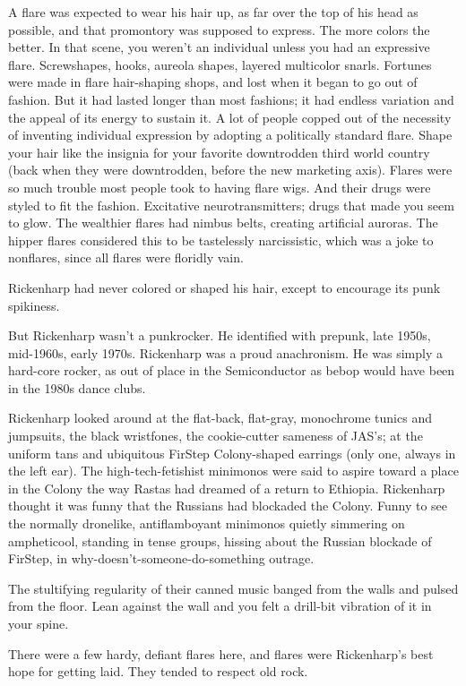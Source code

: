 A flare was expected to wear his hair up, as far over the top of his head as possible, and that promontory was supposed to express. The more colors the better. In that scene, you weren’t an individual unless you had an expressive flare. Screwshapes, hooks, aureola shapes, layered multicolor snarls. Fortunes were made in flare hair-shaping shops, and lost when it began to go out of fashion. But it had lasted longer than most fashions; it had endless variation and the appeal of its energy to sustain it. A lot of people copped out of the necessity of inventing individual expression by adopting a politically standard flare. Shape your hair like the insignia for your favorite downtrodden third world country (back when they were downtrodden, before the new marketing axis). Flares were so much trouble most people took to having flare wigs. And their drugs were styled to fit the fashion. Excitative neurotransmitters; drugs that made you seem to glow. The wealthier flares had nimbus belts, creating artificial auroras. The hipper flares considered this to be tastelessly narcissistic, which was a joke to nonflares, since all flares were floridly vain.

Rickenharp had never colored or shaped his hair, except to encourage its punk spikiness.

But Rickenharp wasn’t a punkrocker. He identified with prepunk, late 1950s, mid-1960s, early 1970s. Rickenharp was a proud anachronism. He was simply a hard-core rocker, as out of place in the Semiconductor as bebop would have been in the 1980s dance clubs.

Rickenharp looked around at the flat-back, flat-gray, monochrome tunics and jumpsuits, the black wristfones, the cookie-cutter sameness of JAS’s; at the uniform tans and ubiquitous FirStep Colony-shaped earrings (only one, always in the left ear). The high-tech-fetishist minimonos were said to aspire toward a place in the Colony the way Rastas had dreamed of a return to Ethiopia. Rickenharp thought it was funny that the Russians had blockaded the Colony. Funny to see the normally dronelike, antiflamboyant minimonos quietly simmering on ampheticool, standing in tense groups, hissing about the Russian blockade of FirStep, in why-doesn’t-someone-do-something outrage.

The stultifying regularity of their canned music banged from the walls and pulsed from the floor. Lean against the wall and you felt a drill-bit vibration of it in your spine.

There were a few hardy, defiant flares here, and flares were Rickenharp’s best hope for getting laid. They tended to respect old rock.

